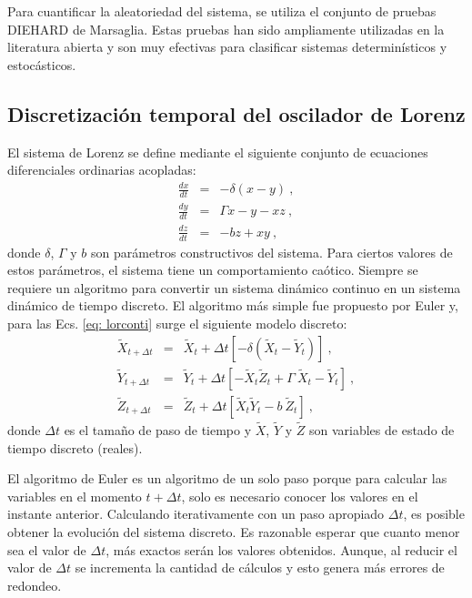 Para cuantificar la aleatoriedad del sistema, se utiliza el conjunto de pruebas DIEHARD de Marsaglia.
Estas pruebas han sido ampliamente utilizadas en la literatura abierta y son muy efectivas para clasificar sistemas determinísticos y estocásticos.

\subsection{Discretización temporal del oscilador de Lorenz}
\label{sec:lorenzdigit}

El sistema de Lorenz se define mediante el siguiente conjunto de ecuaciones diferenciales ordinarias acopladas:
%
\begin{eqnarray} \label{eq:lorconti}
\frac{dx}{dt}&=&-\delta(x-y) \ , \nonumber \\
\frac{dy}{dt}&=&\Gamma x-y-xz \ , \\
\frac{dz}{dt}&=&-bz+xy \ , \nonumber
\end{eqnarray}
%
donde $\delta$, $\Gamma$ y $b$ son parámetros constructivos del sistema.
Para ciertos valores de estos parámetros, el sistema tiene un comportamiento caótico.
Siempre se requiere un algoritmo para convertir un sistema dinámico continuo en un sistema dinámico de tiempo discreto.
El algoritmo más simple fue propuesto por Euler y, para las Ecs. \ref{eq: lorconti} surge el siguiente modelo discreto:
%
\begin{eqnarray}\label{eq:loreuler}
{\widetilde X}_{t+\Delta t}&=&{\widetilde X}_{t}+ \Delta t \left[
- \delta \left( {\widetilde X}_{t}-{\widetilde Y}_{t} \right)
\right]
\ , \nonumber \\
{\widetilde Y}_{t+\Delta t}&=&{\widetilde Y}_{t}+ \Delta t \left[
-{\widetilde X}_{t}{\widetilde Z}_{t}+\Gamma~{\widetilde
X}_{t}-{\widetilde Y}_{t} \right] \ ,
\\
{\widetilde Z}_{t+\Delta t}&=&{\widetilde Z}_{t}+ \Delta t \left[
{\widetilde X}_{t}{\widetilde Y}_{t}-b~{\widetilde Z}_{t} \right]
\ , \nonumber
\end{eqnarray}
%
donde $\Delta t$ es el tamaño de paso de tiempo y $\widetilde X$, $\widetilde Y$ y $\widetilde Z$ son variables de estado de tiempo discreto (reales).

El algoritmo de Euler es un algoritmo de un solo paso porque para calcular las variables en el momento $t + \Delta t$, solo es necesario conocer los valores en el instante anterior.
Calculando iterativamente con un paso apropiado $\Delta t$, es posible obtener la evolución del sistema discreto.
Es razonable esperar que cuanto menor sea el valor de $\Delta t$, más exactos serán los valores obtenidos.
Aunque, al reducir el valor de $\Delta t$ se incrementa la cantidad de cálculos y esto genera más errores de redondeo.

